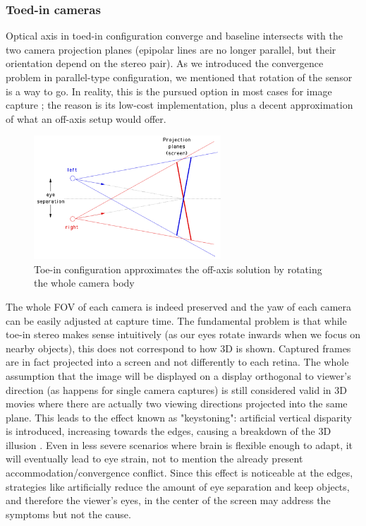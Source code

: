 \subsubsection{Toed-in cameras}
Optical axis in toed-in configuration converge and baseline intersects with the two camera projection planes (epipolar lines are no longer parallel, but their orientation depend on the stereo pair). As we introduced the convergence problem in parallel-type configuration, we mentioned that rotation of the sensor is a way to go. In reality, this is the pursued option in most cases for image capture \cite{link_toein_diffused}; the reason is its low-cost implementation, plus a decent approximation of what an off-axis setup would offer.
\begin{figure}
\centering
\includegraphics[width=7cm]{schemas/toein}
\caption{Toe-in configuration approximates the off-axis solution by rotating the whole camera body}
\label{fig:toedin_cameras}
\end{figure}
The whole FOV of each camera is indeed preserved and the yaw of each camera can be easily adjusted at capture time. The fundamental problem is that while toe-in stereo makes sense intuitively (as our eyes rotate inwards when we focus on nearby objects), this does not correspond to how 3D is shown. Captured frames are in fact projected into a screen and not differently to each retina. The whole assumption that the image will be displayed on a display orthogonal to viewer's direction (as happens for single camera captures) is still considered valid in 3D movies where there are actually two viewing directions projected into the same plane. This leads to the effect known as "keystoning": artificial vertical disparity is introduced, increasing towards the edges, causing a breakdown of the 3D illusion \cite{link_toein_diffused} \cite{camera_convergence}. Even in less severe scenarios where brain is flexible enough to adapt, it will eventually lead to eye strain, not to mention the already present accommodation/convergence conflict. Since this effect is noticeable at the edges, strategies like artificially reduce the amount of eye separation and keep objects, and therefore the viewer's eyes, in the center of the screen may address the symptoms but not the cause.

